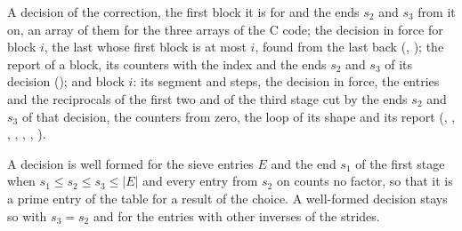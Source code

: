 \begin{definition}\label{def:runBlock}
  \leanok
  A decision of the correction, the first block it is for and the ends $s_2$ and $s_3$ from it on,
  an array of them for the three arrays of the C code; the decision in force for block $i$, the last
  whose first block is at most $i$, found from the last back (,
  ); the report of a block, its counters with the index and the
  ends $s_2$ and $s_3$ of its decision (); and block $i$: its
  segment and steps, the decision in force, the entries and the reciprocals of the first two and of
  the third stage cut by the ends $s_2$ and $s_3$ of that decision, the counters from zero, the loop
  of its shape and its report (,
  , ,
  , ,
  , ).
\end{definition}

\begin{definition}\label{def:decisionWF}
  \leanok
  A decision is well formed for the sieve entries $E$ and the end $s_1$ of the first stage when
  $s_1 \le s_2 \le s_3 \le |E|$ and every entry from $s_2$ on counts no factor, so that it is a
  prime entry of the table for a result of the choice. A well-formed decision stays so with
  $s_3 = s_2$ and for the entries with other inverses of the strides.
\end{definition}

